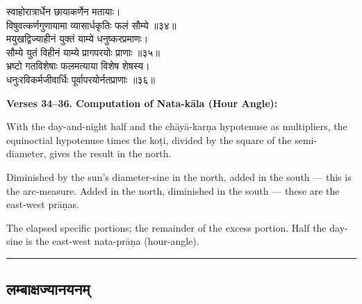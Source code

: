 \documentclass[11pt,a4paper]{article}
\newcommand{\longline}{\noindent\rule{\textwidth}{0.4pt}}
\newcommand{\dev}[1]{{\devanagarifont #1}}
\newcommand{\sectsep}{\par\vspace{0.8em}\longline\vspace{0.8em}}
\begin{document}
\begin{minipage}[t]{0.48\textwidth}
\small\devanagarifont
स्वाहोरात्रार्धेन छायाकर्णेन मतायाः।\\
विषुवत्कर्णगुणायामा व्यासार्धकृतिः फलं सौम्ये ॥३४॥\\[0.5em]
मयुखद्विज्याहीनं युक्तं याम्ये धनुष्करप्रमाणः।\\
सौम्ये युतं विहीनं याम्ये प्रागपरयोः प्राणाः ॥३५॥\\[0.5em]
भ्रष्टो गतविशेषाः फलमत्याया विशेष शेषस्य।\\
धनुःरविकर्मजीवार्धिः पूर्वापरयोर्नतप्राणाः ॥३६॥
\end{minipage}%
\hfill
\begin{minipage}[t]{0.48\textwidth}
\small
\textbf{Verses 34--36. Computation of Nata-k\=ala (Hour Angle):}

With the day-and-night half and the ch\=ay\=a-kar\d{n}a hypotenuse as multipliers, the equinoctial hypotenuse times the ko\d{t}i, divided by the square of the semi-diameter, gives the result in the north.

Diminished by the sun's diameter-sine in the north, added in the south --- this is the arc-measure. Added in the north, diminished in the south --- these are the east-west pr\=a\d{n}as.

The elapsed specific portions; the remainder of the excess portion. Half the day-sine is the east-west nata-pr\=a\d{n}a (hour-angle).
\end{minipage}

\sectsep

\subsection{\dev{लम्बाक्षज्यानयनम्}}
\end{document}

